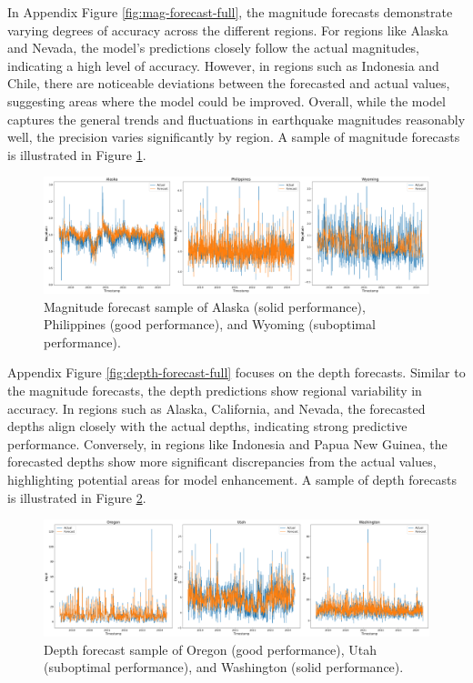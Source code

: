 In Appendix Figure \ref{fig:mag-forecast-full}, the magnitude forecasts demonstrate
varying degrees of accuracy across the different regions. For regions
like Alaska and Nevada, the model's predictions closely follow the
actual magnitudes, indicating a high level of accuracy. However, in
regions such as Indonesia and Chile, there are noticeable deviations
between the forecasted and actual values, suggesting areas where the
model could be improved. Overall, while the model captures the general
trends and fluctuations in earthquake magnitudes reasonably well, the
precision varies significantly by region. A sample of magnitude forecasts
is illustrated in Figure \ref{fig:mag-forecast}.

\begin{figure}[hbtp]
  \centering
  \includegraphics[scale=0.2]{img/magnitude-forecast-sample.png}
  \captionsetup{format=hang}
  \caption{\label{fig:mag-forecast}Magnitude forecast sample of Alaska (solid performance),
    Philippines (good performance), and Wyoming (suboptimal performance).}
\end{figure}

Appendix Figure \ref{fig:depth-forecast-full} focuses on the depth forecasts.
Similar to the magnitude forecasts, the depth predictions show
regional variability in accuracy. In regions such as Alaska,
California, and Nevada, the forecasted depths align closely
with the actual depths, indicating strong predictive performance.
Conversely, in regions like Indonesia and Papua New Guinea, the
forecasted depths show more significant discrepancies from the
actual values, highlighting potential areas for model enhancement.
A sample of depth forecasts is illustrated in Figure \ref{fig:depth-forecast}.

\begin{figure}[hbtp]
  \centering
  \includegraphics[scale=0.2]{img/depth-forecast-sample.png}
  \captionsetup{format=hang}
  \caption{\label{fig:depth-forecast}Depth forecast sample of Oregon (good performance),
    Utah (suboptimal performance), and Washington (solid performance).}
\end{figure}

